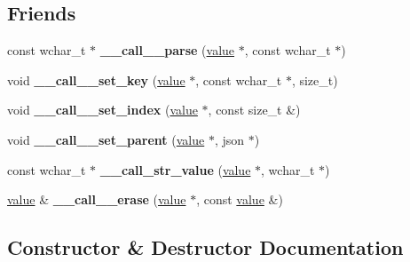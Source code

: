 \subsection*{Friends}
\begin{DoxyCompactItemize}
\item 
const wchar\+\_\+t $\ast$ {\bfseries \+\_\+\+\_\+call\+\_\+\+\_\+parse} (\hyperlink{classformat_1_1value}{value} $\ast$, const wchar\+\_\+t $\ast$)\hypertarget{classformat_1_1value_a91e0ce1b19bc26c2887f0321e7c5c2e8}{}\label{classformat_1_1value_a91e0ce1b19bc26c2887f0321e7c5c2e8}

\item 
void {\bfseries \+\_\+\+\_\+call\+\_\+\+\_\+set\+\_\+key} (\hyperlink{classformat_1_1value}{value} $\ast$, const wchar\+\_\+t $\ast$, size\+\_\+t)\hypertarget{classformat_1_1value_a1891a795b58e455d457f20cc5b36705f}{}\label{classformat_1_1value_a1891a795b58e455d457f20cc5b36705f}

\item 
void {\bfseries \+\_\+\+\_\+call\+\_\+\+\_\+set\+\_\+index} (\hyperlink{classformat_1_1value}{value} $\ast$, const size\+\_\+t \&)\hypertarget{classformat_1_1value_a0a25629ae14bd56c2583fe7b7a2e9397}{}\label{classformat_1_1value_a0a25629ae14bd56c2583fe7b7a2e9397}

\item 
void {\bfseries \+\_\+\+\_\+call\+\_\+\+\_\+set\+\_\+parent} (\hyperlink{classformat_1_1value}{value} $\ast$, json $\ast$)\hypertarget{classformat_1_1value_a43fc53d952c0f7fa94f2926bbc7700f2}{}\label{classformat_1_1value_a43fc53d952c0f7fa94f2926bbc7700f2}

\item 
const wchar\+\_\+t $\ast$ {\bfseries \+\_\+\+\_\+call\+\_\+str\+\_\+value} (\hyperlink{classformat_1_1value}{value} $\ast$, wchar\+\_\+t $\ast$)\hypertarget{classformat_1_1value_a7c14f855473e8ae2783404baaeb77ef3}{}\label{classformat_1_1value_a7c14f855473e8ae2783404baaeb77ef3}

\item 
\hyperlink{classformat_1_1value}{value} \& {\bfseries \+\_\+\+\_\+call\+\_\+\+\_\+erase} (\hyperlink{classformat_1_1value}{value} $\ast$, const \hyperlink{classformat_1_1value}{value} \&)\hypertarget{classformat_1_1value_adeaa91cfb33848f060cc7ebccd228ecb}{}\label{classformat_1_1value_adeaa91cfb33848f060cc7ebccd228ecb}

\end{DoxyCompactItemize}


\subsection{Constructor \& Destructor Documentation}
